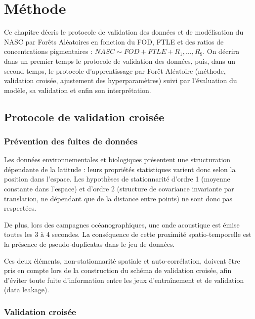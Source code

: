 \chapter{Méthode}
Ce chapitre décris le protocole de validation des données et de modélisation du NASC par Forêts Aléatoires en fonction du FOD, FTLE et des ratios de concentrations pigmentaires : $NASC \sim FOD + FTLE + R_1, \ldots, R_9$. On décrira dans un premier temps le protocole de validation des données, puis, dans un second temps, le protocole d'apprentissage par Forêt Aléatoire (méthode, validation croisée, ajustement des hyperparamètres) suivi par l’évaluation du modèle, sa validation et enfin son interprétation.
	
	
	
	
	
	
	
	
	
	
	
	
	
	
		



	
	\section{Protocole de validation croisée}
		\label{section:CV}
		\subsection{Prévention des fuites de données}
			Les données environnementales et biologiques présentent une structuration dépendante de la latitude : leurs propriétés statistiques varient donc selon la position dans l'espace. Les hypothèses de stationnarité d'ordre 1 (moyenne constante dans l'espace) et d'ordre 2 (structure de covariance invariante par translation, ne dépendant que de la distance entre points) ne sont donc pas respectées.
			
			De plus, lors des campagnes océanographiques, une onde acoustique est émise toutes les 3 à 4 secondes. La conséquence de cette proximité spatio-temporelle est la présence de pseudo-duplicatas dans le jeu de données. 
			
			Ces deux éléments, non-stationnarité spatiale et auto-corrélation, doivent être pris en compte lors de la construction du schéma de validation croisée, afin d'éviter toute fuite d'information entre les jeux d'entraînement et de validation (data leakage).
		\subsection{Validation croisée}
		
